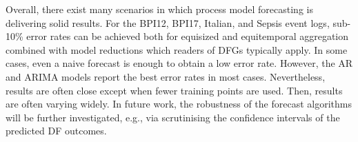 Overall, there exist many scenarios in which process model forecasting is delivering solid results.
For the BPI12, BPI17, Italian, and Sepsis event logs, sub-10\% error rates can be achieved both for equisized and equitemporal aggregation combined with model reductions which readers of DFGs typically apply.
In some cases, even a naive forecast is enough to obtain a low error rate.
However, the AR and ARIMA models report the best error rates in most cases.
Nevertheless, results are often close except when fewer training points are used.
Then, results are often varying widely.
In future work, the robustness of the forecast algorithms will be further investigated, e.g., via scrutinising the confidence intervals of the predicted DF outcomes.


\vspace{-1.5cm}








